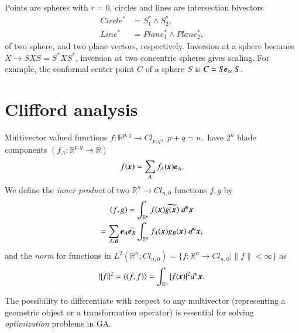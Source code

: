 \documentclass[cameraready]{jcmsi}%
\newcommand{\R}{\mathbb{R}}
\newcommand{\gvec}[1]{\ensuremath{\mbox{\textbf{\textit{#1}}}}}
\newcommand{\vect}[1]{\ensuremath{\mbox{\textbf{\textit{#1}}}}}
\begin{document}
Points are spheres with $r=0$, circles and lines are intersection bivectors 
\begin{align}
  Circle^* &= S^*_1\wedge S^*_2, 
  \nonumber \\
  Line^* &= Plane_1^*\wedge Plane_2^*,
\end{align}
of two sphere, and two plane vectors, respectively. Inversion at a sphere becomes
$X \rightarrow SXS = S^*XS^*$, inversion at two concentric spheres gives scaling. For example, the conformal center point $C$ of a sphere $S$ is
  $C = S \gvec{e}_{\infty} \,S$. 




\section{Clifford analysis}

Multivector valued functions
  $f: \R^{p,q} \rightarrow Cl_{p,q}, \,\, p+q=n, $ have $2^n$ blade components
  $(f_A: \R^{p,q} \rightarrow \R)$
\begin{equation}\label{eq:MVfunc}
    f(\vect{x})  =  \sum_{A} f_{A}(\vect{x}) {\vect{e}}_{A}.
\end{equation}
We define the \textit{inner product} of two
$\R^n \rightarrow Cl_{n,0}$ functions  $f, g$ by
\begin{gather}
  (f,g) 
  = \int_{\R^n}f(\mbox{\boldmath $x$})
    \widetilde{g(\mbox{\boldmath $x$})}\;d^n\mbox{\boldmath $x$}
  \nonumber \\
  = \sum_{A,B}\mbox{\boldmath $e$}_A \widetilde{\mbox{\boldmath $e$}_B}
    \int_{\R^n}f_A (\mbox{\boldmath $x$})
    g_B (\mbox{\boldmath $x$})\;d^n\mbox{\boldmath $x$},
  \label{eq:mc2}
\end{gather}
and the \textit{norm} for functions in $L^2(\R^n;Cl_{n,0})
   = \{f: \R^n \rightarrow Cl_{n,0} \mid \|f\| < \infty \}$ as
\begin{equation}\label{eq:0mc2}
  \|f\|^2 
   = \left\langle ( f,f ) \right\rangle
   =
   \int_{\mathbb{R}^n} |f(\vect{x})|^2 d^n\mbox{\boldmath $x$}.
\end{equation}

The possibility to differentiate with respect to any multivector (representing a geometric object or a transformation operator) is essential for solving \textit{optimization} problems in GA. 
\end{document}
